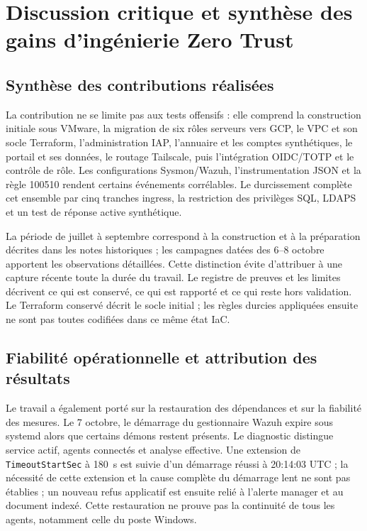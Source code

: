 \documentclass[a4paper,12pt]{report}
\begin{document}
\section{Discussion critique et synthèse des gains d'ingénierie Zero Trust}
\label{sec:p4-discussion}
\subsection{Synthèse des contributions réalisées}
La contribution ne se limite pas aux tests offensifs : elle comprend la construction initiale sous VMware, la migration de six rôles serveurs vers GCP, le VPC et son socle Terraform, l'administration IAP, l'annuaire et les comptes synthétiques, le portail et ses données, le routage Tailscale, puis l'intégration OIDC/TOTP et le contrôle de rôle. Les configurations Sysmon/Wazuh, l'instrumentation JSON et la règle 100510 rendent certains événements corrélables. Le durcissement complète cet ensemble par cinq tranches ingress, la restriction des privilèges SQL, LDAPS et un test de réponse active synthétique.

La période de juillet à septembre correspond à la construction et à la préparation décrites dans les notes historiques ; les campagnes datées des 6--8 octobre apportent les observations détaillées. Cette distinction évite d'attribuer à une capture récente toute la durée du travail. Le registre de preuves et les limites décrivent ce qui est conservé, ce qui est rapporté et ce qui reste hors validation. Le Terraform conservé décrit le socle initial ; les règles durcies appliquées ensuite ne sont pas toutes codifiées dans ce même état IaC.

\subsection{Fiabilité opérationnelle et attribution des résultats}
Le travail a également porté sur la restauration des dépendances et sur la fiabilité des mesures. Le 7 octobre, le démarrage du gestionnaire Wazuh expire sous systemd alors que certains démons restent présents. Le diagnostic distingue service actif, agents connectés et analyse effective. Une extension de \texttt{TimeoutStartSec} à 180~s est suivie d'un démarrage réussi à 20:14:03 UTC ; la nécessité de cette extension et la cause complète du démarrage lent ne sont pas établies ; un nouveau refus applicatif est ensuite relié à l'alerte manager et au document indexé. Cette restauration ne prouve pas la continuité de tous les agents, notamment celle du poste Windows.
\end{document}
